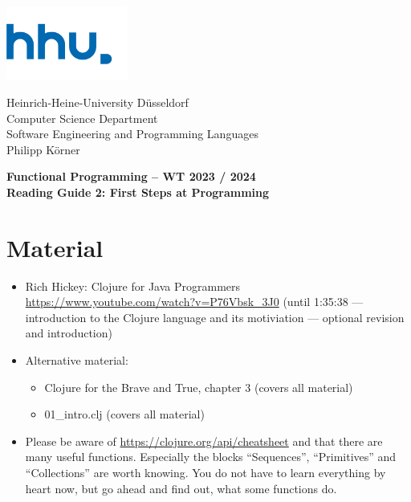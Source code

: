 \documentclass[11pt,a4paper]{article}
\begin{document}
\begin{minipage}[b]{\textwidth}
	\parbox[t]{5cm}{%
		\includegraphics[width=4cm]{unilogo}
		\hfill
	}
	\parbox[b]{11cm}{%
		Heinrich-Heine-University D\"usseldorf\\
		Computer Science Department\\
		Software Engineering and Programming Languages\\
		Philipp K\"orner
	}
\end{minipage}
\begin{center}
	\bf
	Functional Programming -- WT 2023 / 2024\\
	Reading Guide 2: First Steps at Programming
\end{center}

\pagestyle{empty}

\section{Material} 

\begin{itemize}
    \item Rich Hickey: Clojure for Java Programmers \url{https://www.youtube.com/watch?v=P76Vbsk_3J0} (until 1:35:38 --- introduction to the Clojure language and its motiviation --- optional revision and introduction)
    \item Alternative material:
        \begin{itemize}
            \item Clojure for the Brave and True, chapter 3 (covers all material)
            \item 01\_intro.clj (covers all material)
        \end{itemize}
    \item Please be aware of \url{https://clojure.org/api/cheatsheet} and that there are many useful functions.
        Especially the blocks ``Sequences'', ``Primitives'' and ``Collections'' are worth knowing.
        You do not have to learn everything by heart now, but go ahead and find out, what some functions do.
\end{itemize}
\end{document}
